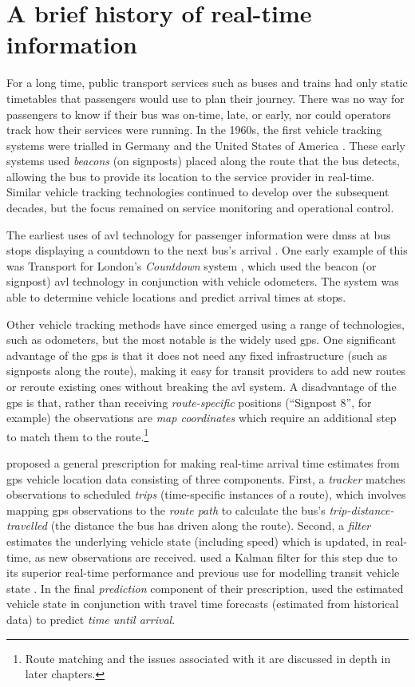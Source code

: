 \section{A brief history of real-time information}
\label{sec:literature}

For a long time, public transport services such as buses and trains had only static timetables that passengers would use to plan their journey. There was no way for passengers to know if their bus was on-time, late, or early, nor could operators track how their services were running. In the 1960s, the first vehicle tracking systems were trialled in Germany and the United States of America \citep{TCRP_1997}. These early systems used \emph{beacons} (on signposts) placed along the route that the bus detects, allowing the bus to provide its location to the service provider in real-time. Similar vehicle tracking technologies continued to develop over the subsequent decades, but the focus remained on service monitoring and operational control.


The earliest uses of \gls{avl} technology for passenger information were \glspl{dms} at bus stops displaying a countdown to the next bus's arrival \citep{TCRP_2003}. One early example of this was Transport for London's \emph{Countdown} system \citep{Balogh_1993}, which used the beacon (or signpost) \gls{avl} technology in conjunction with vehicle odometers. The system was able to determine vehicle locations and predict arrival times at stops.


Other vehicle tracking methods have since emerged using a range of technologies, such as odometers, but the most notable is the widely used \gls{gps}. One significant advantage of the \gls{gps} is that it does not need any fixed infrastructure (such as signposts along the route), making it easy for transit providers to add new routes or reroute existing ones without breaking the \gls{avl} system. A disadvantage of the \gls{gps} is that, rather than receiving \emph{route-specific} positions (``Signpost 8'', for example) the observations are \emph{map coordinates} which require an additional step to match them to the route.\footnote{Route matching and the issues associated with it are discussed in depth in later chapters.}


\citet{Cathey_2003} proposed a general prescription for making real-time arrival time estimates from \gls{gps} vehicle location data consisting of three components. First, a \emph{tracker} matches observations to scheduled \emph{trips} (time-specific instances of a route), which involves mapping \gls{gps} observations to the \emph{route path} to calculate the bus's \emph{trip-distance-travelled} (the distance the bus has driven along the route). Second, a \emph{filter} estimates the underlying vehicle state (including speed) which is updated, in real-time, as new observations are received.  used a Kalman filter for this step due to its superior real-time performance and previous use for modelling transit vehicle state \citep{Wall_1999,Dailey_2001}. In the final \emph{prediction} component of their prescription, \citeauthor{Cathey_2003} used the estimated vehicle state in conjunction with travel time forecasts (estimated from historical data) to predict \emph{time until arrival}.


